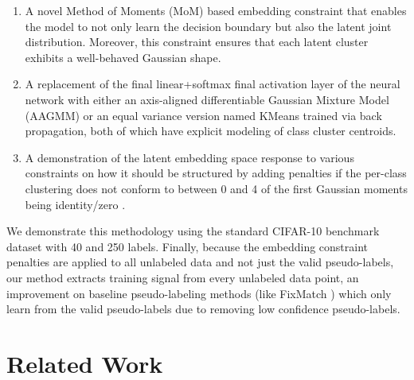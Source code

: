 \documentclass[10pt,twocolumn,letterpaper]{article}
\begin{document}
\begin{enumerate}
	\item A novel Method of Moments (MoM) based embedding constraint that enables the model to not only learn the decision boundary but also the latent joint distribution. 
	Moreover, this constraint ensures that each latent cluster exhibits a well-behaved Gaussian shape.
	\item A replacement of the final linear+softmax final activation layer of the neural network with either an axis-aligned differentiable Gaussian Mixture Model (AAGMM) or an equal variance version named KMeans trained via back propagation, both of which have explicit modeling of class cluster centroids. 
	\item A demonstration of the latent embedding space response to various constraints on how it should be structured by adding penalties if the per-class clustering does not conform to between 0 and 4 of the first Gaussian moments being identity/zero \cite{pearson1936method}.
\end{enumerate}

We demonstrate this methodology using the standard CIFAR-10 benchmark dataset with 40 and 250 labels\cite{cifar10}. %
Finally, because the embedding constraint penalties are applied to all unlabeled data and not just the valid pseudo-labels, our method extracts training signal from every unlabeled data point, an improvement on baseline pseudo-labeling methods (like FixMatch \cite{sohn2020fixmatch}) which only learn from the valid pseudo-labels due to removing low confidence pseudo-labels.


\section{Related Work}

\end{document}

